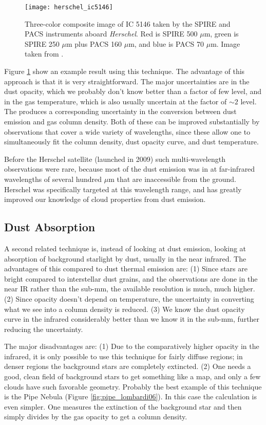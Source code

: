 \begin{figure}
\texttt{[image: herschel\_ic5146]}
\caption[\textit{Herschel} map of IC 5146]{
\label{fig:herschel_ic5146}
Three-color composite image of IC 5146 taken by the SPIRE and PACS instruments aboard \textit{Herschel}. Red is SPIRE 500 $\mu$m, green is SPIRE 250 $\mu$m plus PACS 160 $\mu$m, and blue is PACS 70 $\mu$m. Image taken from \citet{arzoumanian11a}.
}
\end{figure}

Figure \ref{fig:herschel_ic5146} show an example result using this technique. The advantage of this approach is that it is very straightforward. The major uncertainties are in the dust opacity, which we probably don't know better than a factor of few level, and in the gas temperature, which is also usually uncertain at the factor of $\sim 2$ level. The produces a corresponding uncertainty in the conversion between dust emission and gas column density. Both of these can be improved substantially by observations that cover a wide variety of wavelengths, since these allow one to simultaneously fit the column density, dust opacity curve, and dust temperature.

Before the Herschel satellite (launched in 2009) such multi-wavelength observations were rare, because most of the dust emission was in at far-infrared wavelengths of several hundred $\mu$m that are inaccessible from the ground. Herschel was specifically targeted at this wavelength range, and has greatly improved our knowledge of cloud properties from dust emission.

\subsection{Dust Absorption}

A second related technique is, instead of looking at dust emission, looking at absorption of background starlight by dust, usually in the near infrared.  The advantages of this compared to dust thermal emission are: (1) Since stars are bright compared to interstellar dust grains, and the observations are done in the near IR rather than the sub-mm, the available resolution is much, much higher.  (2) Since opacity doesn't depend on temperature, the uncertainty in converting what we see into a column density is reduced.  (3) We know the dust opacity curve in the infrared considerably better than we know it in the sub-mm, further reducing the uncertainty.
  
The major disadvantages are: (1) Due to the comparatively higher opacity in the infrared, it is only possible to use this technique for fairly diffuse regions; in denser regions the background stars are completely extincted. (2) One needs a good, clean field of background stars to get something like a map, and only a few clouds have such favorable geometry.
Probably the best example of this technique is the Pipe Nebula (Figure \ref{fig:pipe_lombardi06}).  In this case the calculation is even simpler. One measures the extinction of the background star and then simply divides by the gas opacity to get a column density.

